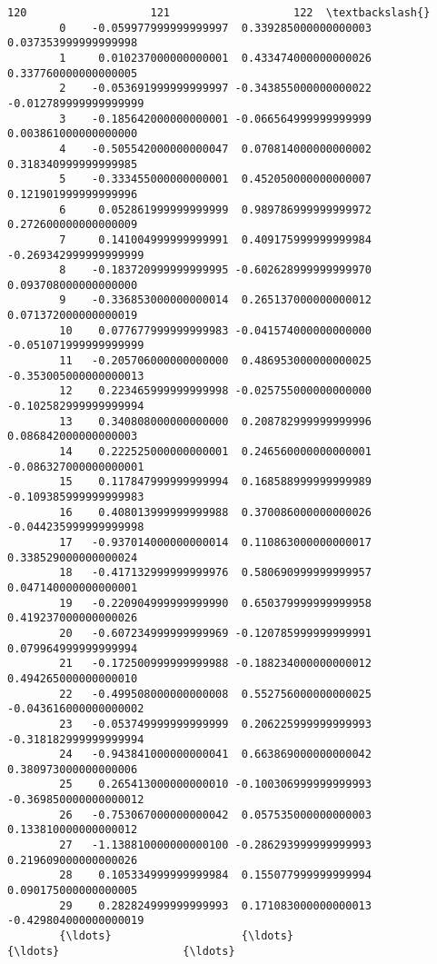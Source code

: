 \documentclass[11pt]{article}
\begin{document}
\begin{Verbatim}[commandchars=\\\{\}]
                               120                   121                   122  \textbackslash{}
        0    -0.059977999999999997  0.339285000000000003  0.037353999999999998   
        1     0.010237000000000001  0.433474000000000026  0.337760000000000005   
        2    -0.053691999999999997 -0.343855000000000022 -0.012789999999999999   
        3    -0.185642000000000001 -0.066564999999999999  0.003861000000000000   
        4    -0.505542000000000047  0.070814000000000002  0.318340999999999985   
        5    -0.333455000000000001  0.452050000000000007  0.121901999999999996   
        6     0.052861999999999999  0.989786999999999972  0.272600000000000009   
        7     0.141004999999999991  0.409175999999999984 -0.269342999999999999   
        8    -0.183720999999999995 -0.602628999999999970  0.093708000000000000   
        9    -0.336853000000000014  0.265137000000000012  0.071372000000000019   
        10    0.077677999999999983 -0.041574000000000000 -0.051071999999999999   
        11   -0.205706000000000000  0.486953000000000025 -0.353005000000000013   
        12    0.223465999999999998 -0.025755000000000000 -0.102582999999999994   
        13    0.340808000000000000  0.208782999999999996  0.086842000000000003   
        14    0.222525000000000001  0.246560000000000001 -0.086327000000000001   
        15    0.117847999999999994  0.168588999999999989 -0.109385999999999983   
        16    0.408013999999999988  0.370086000000000026 -0.044235999999999998   
        17   -0.937014000000000014  0.110863000000000017  0.338529000000000024   
        18   -0.417132999999999976  0.580690999999999957  0.047140000000000001   
        19   -0.220904999999999990  0.650379999999999958  0.419237000000000026   
        20   -0.607234999999999969 -0.120785999999999991  0.079964999999999994   
        21   -0.172500999999999988 -0.188234000000000012  0.494265000000000010   
        22   -0.499508000000000008  0.552756000000000025 -0.043616000000000002   
        23   -0.053749999999999999  0.206225999999999993 -0.318182999999999994   
        24   -0.943841000000000041  0.663869000000000042  0.380973000000000006   
        25    0.265413000000000010 -0.100306999999999993 -0.369850000000000012   
        26   -0.753067000000000042  0.057535000000000003  0.133810000000000012   
        27   -1.138810000000000100 -0.286293999999999993  0.219609000000000026   
        28    0.105334999999999984  0.155077999999999994  0.090175000000000005   
        29    0.282824999999999993  0.171083000000000013 -0.429804000000000019   
        {\ldots}                    {\ldots}                   {\ldots}                   {\ldots}   

\end{Verbatim}
\end{document}
